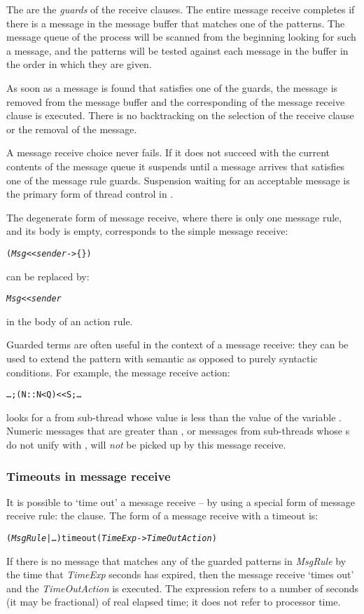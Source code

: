 The  are the \emph{guards} of the receive clauses. The entire message receive completes if there is a message in the message buffer that matches one of the  patterns. The message queue of the process will be scanned from the beginning looking for such a message, and the patterns will be tested against each message in the buffer in the order in which they are given.

As soon as a message is found that satisfies one of the guards, the message is removed from the message buffer and the corresponding  of the message receive clause is executed. There is no backtracking on the selection of the receive clause or the removal of the message.

A message receive choice never fails. If it does not succeed with the current contents of the message queue it suspends until a  message arrives that satisfies one of the message rule guards.  Suspension waiting for an acceptable message is the primary form of thread control in \go.

The degenerate form of message receive, where there is only one message rule, and its body is empty, corresponds to the simple message receive:
\begin{alltt}
( \emph{Msg} << \emph{sender} -> \{\} )
\end{alltt}
can be replaced by:
\begin{alltt}
\emph{Msg} << \emph{sender}
\end{alltt}
in the body of an action rule.

Guarded terms are often useful in the context of a message receive: they can be used to extend the pattern with semantic as opposed to purely syntactic conditions. For example, the message receive action:
\begin{alltt}
\ldots;(N::N<Q) << S;\ldots
\end{alltt}
looks for a  from sub-thread  whose value is less than the value of the variable . Numeric messages that are greater than , or messages from sub-threads whose s do not unify with , will \emph{not} be picked up by this message receive.

\subsubsection{Timeouts in message receive}

It is possible to `time out' a message receive -- by using a special form of message receive rule: the  clause. The form of a message receive with a timeout is:
\begin{alltt}
(\emph{MsgRule} | \ldots{} ) timeout (\emph{TimeExp} -> \emph{TimeOutAction})
\end{alltt}
If there is no message that matches any of the guarded patterns in \emph{MsgRule\subi} by the time that \emph{TimeExp} seconds has expired, then the message receive `times out' and the \emph{TimeOutAction} is executed. The  expression refers to a number of seconds (it may be fractional) of real elapsed time; it does not refer to processor time.

